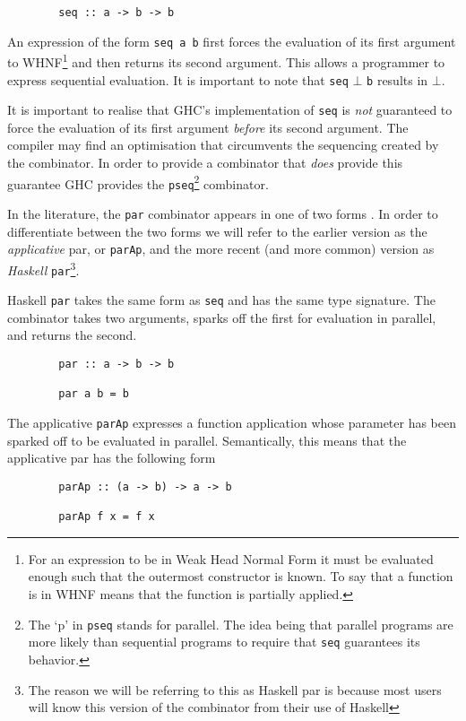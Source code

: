 \begin{verbatim}
        seq :: a -> b -> b 
\end{verbatim}

An expression of the form \verb=seq a b= first forces the evaluation of its
first argument to WHNF\footnote{For an expression to be in Weak Head Normal
Form it must be evaluated enough such that the outermost constructor is known.
To say that a function is in WHNF means that the function is partially
applied.} and then returns its second argument. This allows a programmer to
express sequential evaluation. It is important to note that \verb=seq= $\bot$
\verb=b= results in $\bot$.

It is important to realise that GHC's implementation of \verb=seq= is
\emph{not} guaranteed to force the evaluation of its first argument
\emph{before} its second argument. The compiler may find an optimisation that
circumvents the sequencing created by the combinator. In order to provide a
combinator that \emph{does} provide this guarantee GHC provides the
\verb-pseq-\footnote{The `p' in \texttt{pseq} stands for parallel.  The idea
being that parallel programs are more likely than sequential programs to
require that \texttt{seq} guarantees its behavior.} combinator.

In the literature, the \verb=par= combinator appears in one of two forms
\citep{HistoryOfHaskell, hughes:thesis}. In order to differentiate between the
two forms we will refer to the earlier version as the \emph{applicative} par, or
\verb=parAp=, and the more recent (and more common) version as \emph{Haskell}
\verb=par=\footnote{The reason we will be referring to this as Haskell par is
because most users will know this version of the combinator from their use of
Haskell}.

Haskell \verb=par= takes the same form as \verb=seq= and has the same type
signature. The combinator takes two arguments, sparks off the first for
evaluation in parallel, and returns the second.

\begin{verbatim}
        par :: a -> b -> b

        par a b = b
\end{verbatim}

The applicative \verb|parAp| expresses a function application whose parameter has been
sparked off to be evaluated in parallel. Semantically, this means that the
applicative par has the following form

\begin{verbatim}
        parAp :: (a -> b) -> a -> b

        parAp f x = f x
\end{verbatim}

